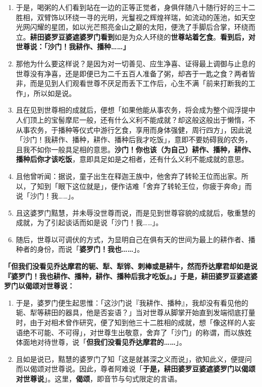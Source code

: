 \begin{enumerate}\item 于是，喝粥的人们看到站在一边的正等正觉者，身俱伴随八十随行好的三十二胜相，双臂饰以环绕一寻的光明，光鬘视之辉煌祥瑞，如流动的莲池，如天空光网闪耀的星团，如以光芒照亮金山之巅的太阳，便洗了手脚后合掌，环绕而立。\textbf{耕田婆罗豆婆遮婆罗门看到}如是为众人环绕的\textbf{世尊站着乞食}。\textbf{看到后，对世尊说：「沙门！我耕作、播种……」}
\item 那他为什么要这样说？是因为对一切善见、应生净喜、证得最上调御与止息的世尊没有净喜，还是即便已为二千五百人准备了粥，却吝于一匙之食？两者皆非，而是见到人们观看世尊不厌足而丢下工作后，心生不满「前来打断我的工作」，所以如是说。
\item 且在见到世尊相的成就后，便想「如果他能从事农务，将会成为整个阎浮提中人们顶上的宝髻摩尼一般，还有什么义利不能成就？却这般这般出于懒惰，不从事农务，于播种等仪式中游行乞食，享用而身体强健，周行四方」，因此说「沙门！我耕作、播种，耕作、播种后我才吃饭」，意即不要妨碍我的农务，且我不如你一般具足相的意思。\textbf{沙门！你也该（为自己）耕作、播种，耕作、播种后你才该吃饭}，意即具足如是之相者，还有什么义利不能成就的意思。
\item 且他曾听闻：据说，童子出生在释迦王族中，他舍弃了转轮王位而出家。所以，了知到「眼下这位就是」，便作诘难「舍弃了转轮王位，你疲于奔命」而说「沙门！我……」。
\item 且这婆罗门黠慧，并未辱没世尊而说，而是见到世尊容貌的成就后，敬重慧的成就，为了引起谈话而如是说「沙门！我……」。
\item 随后，世尊以可调伏的方式，为显明自己在俱有天的世间为最上的耕作者、播种者的身份，而说「\textbf{婆罗门！我也……}」。\end{enumerate}

\textbf{「但我们没看见乔达摩君的轭、犁、犁铧、刺棒或是耕牛，然而乔达摩君却如是说『婆罗门！我也耕作、播种，耕作、播种后我才吃饭』。」于是，耕田婆罗豆婆遮婆罗门以偈颂对世尊说：}

\begin{enumerate}\item 于是，婆罗门便生起思惟：「这沙门说『我耕作、播种』，我却没有看见他的轭、犁等耕田的器具，他是否妄语？」当对世尊从脚掌开始直到发端彻底打量时，由于对相术曾作研究，便了知到他三十二胜相的成就，想「像这样的人妄语绝不可能、不可得」，对世尊生出敬意，舍弃了「沙门」的称谓，而以族姓体面地对待世尊，说「\textbf{但我们没看见乔达摩君的……}」。
\item 且如是说已，黠慧的婆罗门了知「这是就甚深之义而说」，欲知此义，便提问而以偈颂对世尊说。因此，尊者阿难说「\textbf{于是，耕田婆罗豆婆遮婆罗门以偈颂对世尊说}」。这里，\textbf{偈颂}，即音节与句式限定的言语。\end{enumerate}

